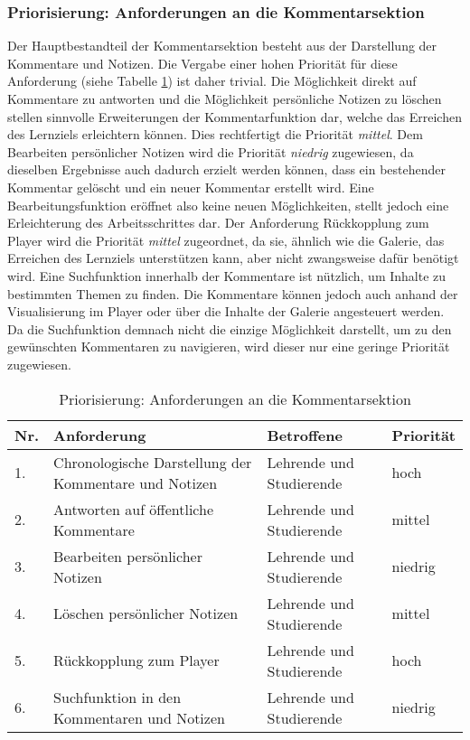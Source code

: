 \subsubsection{Priorisierung: Anforderungen an die Kommentarsektion}
Der Hauptbestandteil der Kommentarsektion besteht aus der Darstellung der Kommentare und Notizen. Die Vergabe einer hohen Priorität für diese Anforderung (siehe Tabelle \ref{tab:PriorisierungAnforderungenKommentarsektion}) ist daher trivial. Die Möglichkeit direkt auf Kommentare zu antworten und die Möglichkeit persönliche Notizen zu löschen stellen sinnvolle Erweiterungen der Kommentarfunktion dar, welche das Erreichen des Lernziels erleichtern können. Dies rechtfertigt die Priorität \textit{mittel}. Dem Bearbeiten persönlicher Notizen wird die Priorität \textit{niedrig} zugewiesen, da dieselben Ergebnisse auch dadurch erzielt werden können, dass ein bestehender Kommentar gelöscht und ein neuer Kommentar erstellt wird. Eine Bearbeitungsfunktion eröffnet also keine neuen Möglichkeiten, stellt jedoch eine Erleichterung des Arbeitsschrittes dar. Der Anforderung \glqq Rückkopplung zum Player\grqq{} wird die Priorität \textit{mittel} zugeordnet, da sie, ähnlich wie die Galerie, das Erreichen des Lernziels unterstützen kann, aber nicht zwangsweise dafür benötigt wird.
Eine Suchfunktion innerhalb der Kommentare ist nützlich, um Inhalte zu bestimmten Themen zu finden. Die Kommentare können jedoch auch anhand der Visualisierung im Player oder über die Inhalte der Galerie angesteuert werden. Da die Suchfunktion demnach nicht die einzige Möglichkeit darstellt, um zu den gewünschten Kommentaren zu navigieren, wird dieser nur eine geringe Priorität zugewiesen.

\begin{table}[!ht]
\def\arraystretch{1.4}
\caption{Priorisierung: Anforderungen an die Kommentarsektion}
\label{tab:PriorisierungAnforderungenKommentarsektion}
 \begin{tabularx}{\textwidth}{lXll}      
    \hline
    Nr. & Anforderung & Betroffene & Priorität
    \\\hline
    1. & Chronologische Darstellung der Kommentare und Notizen & Lehrende und Studierende & hoch\\
    2. & Antworten auf öffentliche Kommentare & Lehrende und Studierende & mittel\\
    3. & Bearbeiten persönlicher Notizen & Lehrende und Studierende & niedrig\\
    4. & Löschen persönlicher Notizen & Lehrende und Studierende & mittel\\
    5. & Rückkopplung zum Player & Lehrende und Studierende & hoch\\
    6. & Suchfunktion in den Kommentaren und Notizen & Lehrende und Studierende & niedrig\\
    \end{tabularx}
\end{table}


